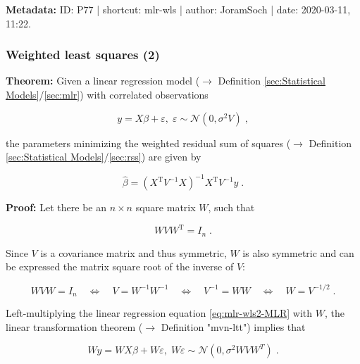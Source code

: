 \documentclass[a4paper,12pt,twoside]{book}
\begin{document}
\vspace{1em}
\textbf{Metadata:} ID: P77 | shortcut: mlr-wls | author: JoramSoch | date: 2020-03-11, 11:22.
\vspace{1em}



\subsubsection[\textbf{Weighted least squares (2)}]{Weighted least squares (2)} \label{sec:mlr-wls2}
\setcounter{equation}{0}

\textbf{Theorem:} Given a linear regression model ($\rightarrow$ Definition \ref{sec:Statistical Models}/\ref{sec:mlr}) with correlated observations

\begin{equation} \label{eq:mlr-wls2-MLR}
y = X\beta + \varepsilon, \; \varepsilon \sim \mathcal{N}(0, \sigma^2 V) \; ,
\end{equation}

the parameters minimizing the weighted residual sum of squares ($\rightarrow$ Definition \ref{sec:Statistical Models}/\ref{sec:rss}) are given by

\begin{equation} \label{eq:mlr-wls2-WLS}
\hat{\beta} = (X^\mathrm{T} V^{-1} X)^{-1} X^\mathrm{T} V^{-1} y \; .
\end{equation}


\vspace{1em}
\textbf{Proof:} Let there be an $n \times n$ square matrix $W$, such that

\begin{equation} \label{eq:mlr-wls2-W-def}
W V W^\mathrm{T} = I_n \; .
\end{equation}

Since $V$ is a covariance matrix and thus symmetric, $W$ is also symmetric and can be expressed the matrix square root of the inverse of $V$:

\begin{equation} \label{eq:mlr-wls2-W-V}
W V W = I_n \quad \Leftrightarrow \quad V = W^{-1} W^{-1} \quad \Leftrightarrow \quad V^{-1} = W W \quad \Leftrightarrow \quad W = V^{-1/2} \; .
\end{equation}

Left-multiplying the linear regression equation \eqref{eq:mlr-wls2-MLR} with $W$, the linear transformation theorem ($\rightarrow$ Definition "mvn-ltt") implies that

\begin{equation} \label{eq:mlr-wls2-MLR-W}
Wy = WX\beta + W\varepsilon, \; W\varepsilon \sim \mathcal{N}(0, \sigma^2 W V W^T) \; .
\end{equation}
\end{document}
